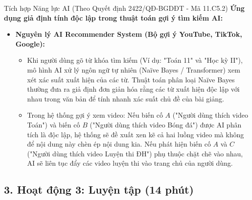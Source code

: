 \documentclass[12pt, a4paper]{article}
\begin{document}
\begin{aibox}{Tích hợp Năng lực AI (Theo Quyết định 2422/QĐ-BGDĐT - Mã 11.C5.2)}
    \textbf{Ứng dụng giả định tính độc lập trong thuật toán gợi ý tìm kiếm AI:}
    \begin{itemize}[leftmargin=0.6cm]
        \item \textbf{Nguyên lý AI Recommender System (Bộ gợi ý YouTube, TikTok, Google):}
        \begin{itemize}
            \item Khi người dùng gõ từ khóa tìm kiếm (Ví dụ: "Toán 11" và "Học kỳ II"), mô hình AI xử lý ngôn ngữ tự nhiên (Naïve Bayes / Transformer) xem xét xác suất xuất hiện của các từ. Thuật toán phân loại Naïve Bayes thường đưa ra giả định đơn giản hóa rằng các từ xuất hiện độc lập với nhau trong văn bản để tính nhanh xác suất chủ đề của bài giảng.
            \item Trong hệ thống gợi ý xem video: Nếu biến cố $A$ ("Người dùng thích video Toán") và biến cố $B$ ("Người dùng thích video Bóng đá") được AI phân tích là độc lập, hệ thống sẽ đề xuất xen kẽ cả hai luồng video mà không để nội dung này chèn ép nội dung kia. Nếu phát hiện biến cố $A$ và $C$ ("Người dùng thích video Luyện thi ĐH") phụ thuộc chặt chẽ vào nhau, AI sẽ liên tục đẩy các video luyện thi vào trang chủ của người dùng.
        \end{itemize}
    \end{itemize}
\end{aibox}

\subsection*{3. Hoạt động 3: Luyện tập (14 phút)}
\end{document}
